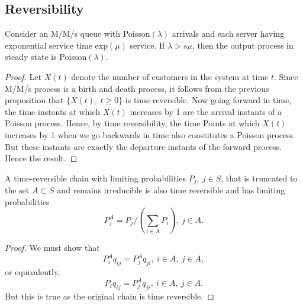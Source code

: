 \documentclass[a4paper,10pt]{article}
\begin{document}
\subsection{Reversibility}
\begin{cor}
Consider an M/M/s queue with Poisson$(\lambda)$ arrivals and each server having exponential service time exp$(\mu)$ service. If $\lambda > s \mu$, then the output process in steady state is Poisson$(\lambda)$.
\end{cor}
\begin{proof}
Let $X(t)$ denote the number of customers in the system at time $t$. Since M/M/s process is a birth and death process, it follows from the previous proposition that $\{X(t),~t \geq 0\}$ is time reversible. Now going forward in time, the time instants at which $X(t)$ increases by 1 are the arrival instants of a Poisson process. Hence, by time reversibility, the time Points at which $X(t)$ increases by 1 when we go backwards in time also constitutes a Poisson process. But these instants are exactly the departure instants of the forward process. Hence the result.
\end{proof}
\begin{prop}
A time-reversible chain with limiting probabilities $P_j,~ j \in S$, that is truncated to the set $A\subset S$ and remains irreducible is also time reversible and has limiting probabilities 
\begin{equation}
P_j^A=P_j/(\sum_{i \in A}P_i),~ j \in A.
\end{equation}
\end{prop}
\begin{proof}
We must show that 
\begin{equation*}
P_i^Aq_{ij}=P_j^Aq_{ji},~ i \in A,~ j \in A,
\end{equation*}
or equivalently,
\begin{equation*}
P_iq_{ij}=P_j^Aq_{ji},~ i \in A,~ j \in A.
\end{equation*}
But this is true as the original chain is time reversible.
\end{proof}
\end{document}
